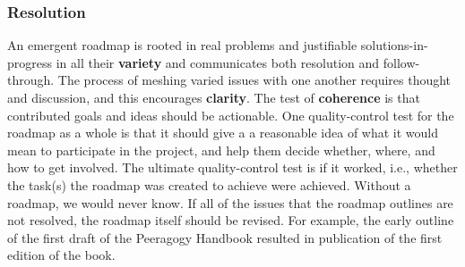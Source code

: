 \subsubsection*{Resolution}
An emergent roadmap is rooted in real problems and justifiable
solutions-in-progress in all their \textbf{variety} and communicates
both resolution and follow-through.  The process of meshing varied
issues with one another requires thought and discussion, and this
encourages \textbf{clarity}.  The test of \textbf{coherence} is that
contributed goals and ideas should be actionable.
%
One quality-control test for the roadmap as a whole is that it should
give a  a reasonable idea of what it would
mean to participate in the project, and help them decide whether,
where, and how to get involved.
The ultimate quality-control test is if it worked, i.e., whether the task(s) the roadmap was created to achieve were achieved.  Without a roadmap, we would never know.  If all of the issues that the roadmap outlines are not resolved, the roadmap itself should be revised.  For example, the early outline of the first draft of the Peeragogy Handbook resulted in publication of the first edition of the book.

